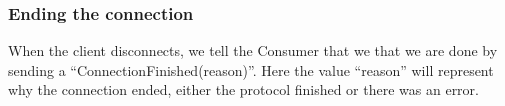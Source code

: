 \subsubsection{Ending the connection}
When the client disconnects, we tell the Consumer that we that we are done by sending a ``ConnectionFinished(reason)''. Here the value ``reason'' will represent why the connection ended, either the protocol finished or there was an error.

%




